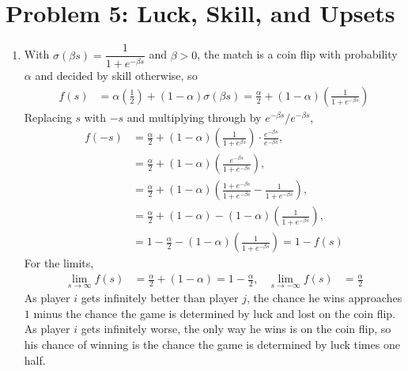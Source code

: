 \documentclass[11pt]{article}
\begin{document}
\section*{Problem 5: Luck, Skill, and Upsets}

\begin{enumerate}[label=(\alph*)]
  \item With $\sigma(\beta s) = \dfrac{1}{1+e^{-\beta s}}$ and $\beta > 0$, the match is a coin flip with
  probability $\alpha$ and decided by skill otherwise, so
  \begin{align}
    f(s) &= \alpha\left(\tfrac{1}{2}\right) + (1-\alpha)\sigma(\beta s)
    = \frac{\alpha}{2} + (1-\alpha)\left(\frac{1}{1+e^{-\beta s}}\right)
  \end{align}
  Replacing $s$ with $-s$ and multiplying through by $e^{-\beta s}/e^{-\beta s}$,
  \begin{align}
    f(-s) &= \frac{\alpha}{2} + (1-\alpha)\left(\frac{1}{1+e^{\beta s}}\right)\cdot\frac{e^{-\beta s}}{e^{-\beta s}}, \\
    &= \frac{\alpha}{2} + (1-\alpha)\left(\frac{e^{-\beta s}}{1+e^{-\beta s}}\right), \\
    &= \frac{\alpha}{2} + (1-\alpha)\left(\frac{1+e^{-\beta s}}{1+e^{-\beta s}} - \frac{1}{1+e^{-\beta s}}\right), \\
    &= \frac{\alpha}{2} + (1-\alpha) - (1-\alpha)\left(\frac{1}{1+e^{-\beta s}}\right), \\
    &= 1 - \frac{\alpha}{2} - (1-\alpha)\left(\frac{1}{1+e^{-\beta s}}\right) = 1 - f(s)
  \end{align}
  For the limits,
  \begin{align}
    \lim_{s\to\infty} f(s) &= \frac{\alpha}{2} + (1-\alpha) = 1 - \frac{\alpha}{2}, &
    \lim_{s\to-\infty} f(s) &= \frac{\alpha}{2}
  \end{align}
  As player $i$ gets infinitely better than player $j$, the chance he wins approaches $1$ minus the
  chance the game is determined by luck and lost on the coin flip. As player $i$ gets infinitely
  worse, the only way he wins is on the coin flip, so his chance of winning is the chance the game is
  determined by luck times one half.


\end{enumerate}
\end{document}
